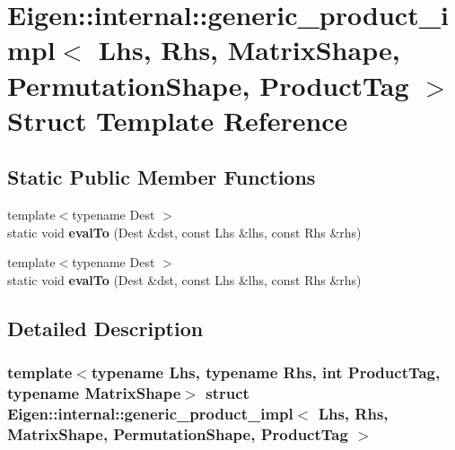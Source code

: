 \hypertarget{struct_eigen_1_1internal_1_1generic__product__impl_3_01_lhs_00_01_rhs_00_01_matrix_shape_00_01_p381c4dc3e0472eab95109350dacc6fc1}{}\section{Eigen\+:\+:internal\+:\+:generic\+\_\+product\+\_\+impl$<$ Lhs, Rhs, Matrix\+Shape, Permutation\+Shape, Product\+Tag $>$ Struct Template Reference}
\label{struct_eigen_1_1internal_1_1generic__product__impl_3_01_lhs_00_01_rhs_00_01_matrix_shape_00_01_p381c4dc3e0472eab95109350dacc6fc1}
\subsection*{Static Public Member Functions}
\begin{DoxyCompactItemize}
\item 
\mbox{\label{struct_eigen_1_1internal_1_1generic__product__impl_3_01_lhs_00_01_rhs_00_01_matrix_shape_00_01_p381c4dc3e0472eab95109350dacc6fc1_af75a43d31cbc3f6a8879a93849dc47a9}} 
{\footnotesize template$<$typename Dest $>$ }\\static void {\bfseries eval\+To} (Dest \&dst, const Lhs \&lhs, const Rhs \&rhs)
\item 
\mbox{\label{struct_eigen_1_1internal_1_1generic__product__impl_3_01_lhs_00_01_rhs_00_01_matrix_shape_00_01_p381c4dc3e0472eab95109350dacc6fc1_af75a43d31cbc3f6a8879a93849dc47a9}} 
{\footnotesize template$<$typename Dest $>$ }\\static void {\bfseries eval\+To} (Dest \&dst, const Lhs \&lhs, const Rhs \&rhs)
\end{DoxyCompactItemize}


\subsection{Detailed Description}
\subsubsection*{template$<$typename Lhs, typename Rhs, int Product\+Tag, typename Matrix\+Shape$>$\newline
struct Eigen\+::internal\+::generic\+\_\+product\+\_\+impl$<$ Lhs, Rhs, Matrix\+Shape, Permutation\+Shape, Product\+Tag $>$}



